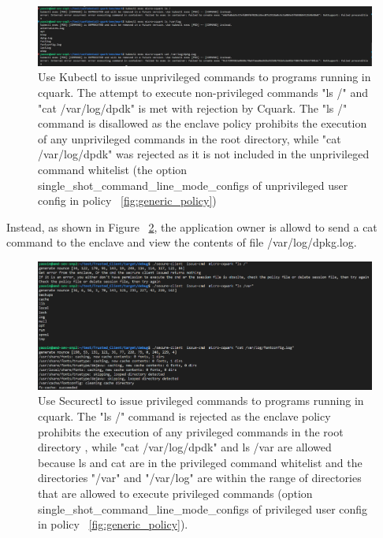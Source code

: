 \begin{figure}[H]
    \centering
    \includegraphics[width=1\textwidth]{images/cuqark_unprivileged_user_cat_rejected.png}
    \caption[Use Kubectl to issue unprivileged commands to programs running in confidential quark]{Use Kubectl to issue unprivileged commands to programs running in cquark.  The attempt to execute non-privileged commands "ls /" and "cat /var/log/dpdk" is met with rejection by Cquark. 
    The "ls /" command is disallowed as the enclave policy prohibits the execution of any unprivileged commands in the root directory, while "cat /var/log/dpdk" was rejected as it is not included in the unprivileged command whitelist (the option single\_shot\_command\_line\_mode\_configs of 
    unprivileged user config in policy ~\ref{fig:generic_policy}) }
    \label{fig:cuqark_unprivileged_user_cat_rejected}
\end{figure}

Instead, as shown in Figure ~\ref{fig:cuqark_privileged_user_cat_allowed}, the application owner is allowd to send a cat command to the enclave and view the contents of file /var/log/dpkg.log.

\begin{figure}[H]
    \centering
    \includegraphics[width=1\textwidth]{images/cuqark_privileged_user_cat_allowed.png}
    \caption[Use Securectl to issue privileged commands to programs running in cquark]{Use Securectl to issue privileged commands to programs running in cquark.  The "ls /" command is rejected as the enclave policy prohibits the execution of any privileged commands in the root directory 
    , while "cat /var/log/dpdk" and ls /var are allowed because ls and cat are in the privileged command whitelist and the directories "/var" and "/var/log" are within the range of directories that are allowed to execute privileged commands (option single\_shot\_command\_line\_mode\_configs of 
    privileged user config in policy ~\ref{fig:generic_policy}).}
    \label{fig:cuqark_privileged_user_cat_allowed}
\end{figure}


